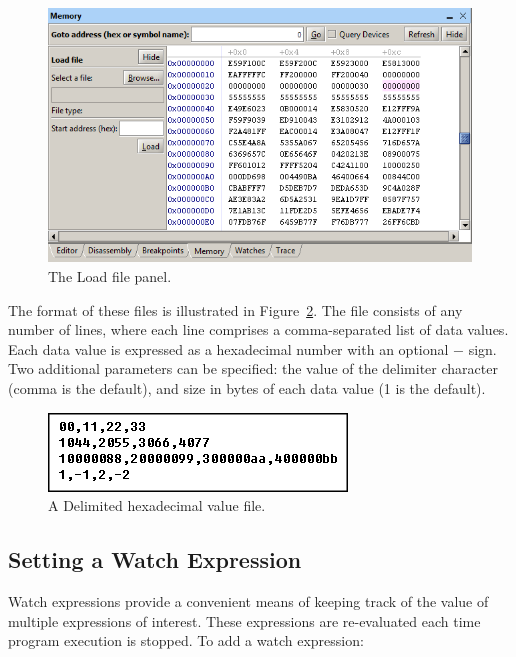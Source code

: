 \documentclass[11pt, twoside, pdftex]{article}
\begin{document}
\begin{figure}[H]
   \begin{center}
      \includegraphics[scale=0.8]{screenshots/figure40.png}
   \end{center}
   \caption{The Load file panel.}
	 \label{fig:40}
\end{figure}

The format of these files is illustrated in Figure~\ref{fig:41}. 
The file consists of any number of lines, where each line
comprises a comma-separated list of data values. Each data value
is expressed as a hexadecimal number with an optional $-$ sign.
Two additional parameters can be specified: the value of the
delimiter character (comma is the default), and size in bytes of
each data value (1 is the default).

\begin{figure}[H]
   \begin{center}
      \includegraphics[scale=.8]{screenshots/figure41.png}
   \end{center}
   \caption{A Delimited hexadecimal value file.}
	 \label{fig:41}
\end{figure}

\subsection{Setting a Watch Expression}
\label{sec:9.3}

Watch expressions provide a convenient means of keeping track of
the value of multiple expressions of interest. These expressions
are re-evaluated each time program execution is stopped. 
To add a watch expression:
\end{document}
